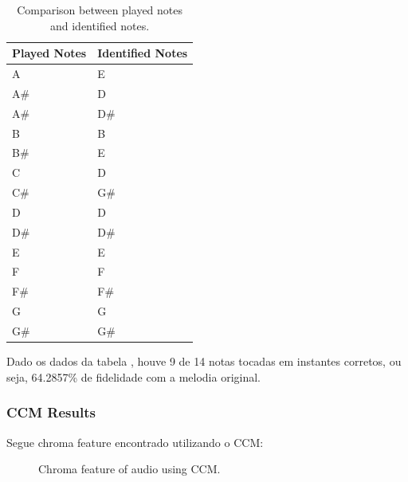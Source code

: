 \documentclass{article}
\begin{document}
	\begin{table}[h]
	 \begin{center}
	 \begin{tabular}{|l|l|}
	  \hline
	  Played Notes & Identified Notes \\
	  \hline
	  A  & E \\
	  A\#  & D \\
	  A\#  & D\# \\
	  B  & B \\
	  B\#  & E \\
	  C  & D \\
	  C\#  & G\# \\
	  D  & D \\
	  D\#  & D\# \\
	  E  & E \\
	  F  & F \\
	  F\#  & F\# \\
	  G  & G \\
	  G\#  & G\# \\
	  \hline
	 \end{tabular}
	\end{center}
	 \caption{Comparison between played notes and identified notes.}
	 \label{tab:table-1-sfft}
	\end{table}

	Dado os dados da tabela , houve 9 de 14 notas tocadas em instantes corretos, ou seja, 64.2857\% de fidelidade com a melodia original.


	\subsubsection{CCM Results}
	Segue chroma feature encontrado utilizando o CCM:
	
	\begin{figure}[h]
	 \centerline{}
	 \caption{Chroma feature of audio using CCM.}
	 \label{fig:1-ccm}
	\end{figure}	
\end{document}
